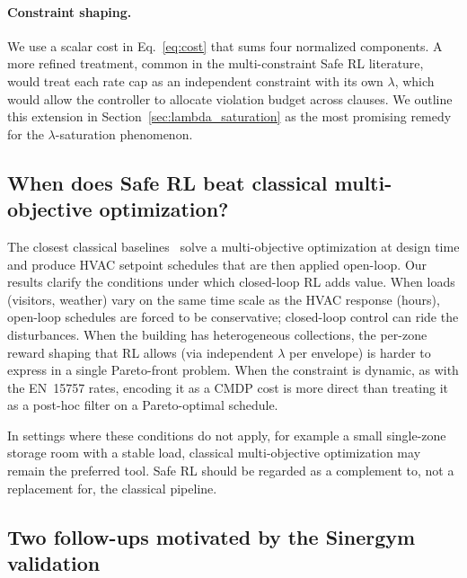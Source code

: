 \documentclass[11pt,a4paper]{article}
\begin{document}
\paragraph{Constraint shaping.}
We use a scalar cost in Eq.~\eqref{eq:cost} that sums four normalized
components. A more refined treatment, common in the multi-constraint
Safe RL literature, would treat each rate cap as an independent
constraint with its own $\lambda$, which would allow the controller
to allocate violation budget across clauses. We outline this extension
in Section~\ref{sec:lambda_saturation} as the most promising remedy
for the $\lambda$-saturation phenomenon.

\subsection{When does Safe RL beat classical multi-objective optimization?}

The closest classical baselines~\citep{ascione2018museum,schito2020museum}
solve a multi-objective optimization at design time and produce HVAC
setpoint schedules that are then applied open-loop. Our results clarify
the conditions under which closed-loop RL adds value. When loads
(visitors, weather) vary on the same time scale as the HVAC response
(hours), open-loop schedules are forced to be conservative; closed-loop
control can ride the disturbances. When the building has heterogeneous
collections, the per-zone reward shaping that RL allows (via
independent $\lambda$ per envelope) is harder to express in a single
Pareto-front problem. When the constraint is dynamic, as with the
EN~15757 rates, encoding it as a CMDP cost is more direct than
treating it as a post-hoc filter on a Pareto-optimal schedule.

In settings where these conditions do not apply, for example a small
single-zone storage room with a stable load, classical multi-objective
optimization may remain the preferred tool. Safe RL should be regarded
as a complement to, not a replacement for, the classical pipeline.

\subsection{Two follow-ups motivated by the Sinergym validation}
\end{document}
